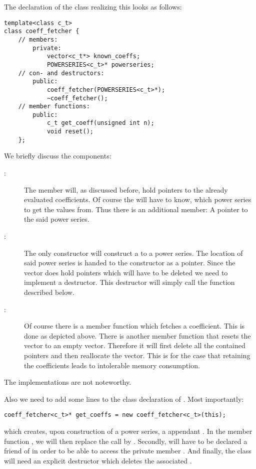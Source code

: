 The declaration of the class realizing this looks as follows:
\begin{lstlisting}
template<class c_t>
class coeff_fetcher {
	// members:
		private:
			vector<c_t*> known_coeffs;
			POWERSERIES<c_t>* powerseries;
	// con- and destructors:
		public:
			coeff_fetcher(POWERSERIES<c_t>*);
			~coeff_fetcher();
	// member functions:
		public:
			c_t get_coeff(unsigned int n);
			void reset();
	};
\end{lstlisting}
We briefly discuss the components:
\begin{description}
\item[:] The member  will, as discussed before, hold pointers to the already evaluated coefficients. Of course the  will have to know, which power series to get the values from. Thus there is an additional member: A pointer to the said power series.
\item[:] The only constructor will construct a  to a power series. The location of said power series is handed to the constructor as a pointer. Since the vector  does hold pointers which will have to be deleted we need to implement a destructor. This destructor will simply call the function  described below.
\item[:] Of course there is a member function  which fetches a coefficient. This is done as depicted above. There is another member function  that resets the vector  to an empty vector. Therefore it will first delete all the contained pointers and then reallocate the vector. This is for the case that retaining the coefficients leads to intolerable memory consumption.
\end{description}
The implementations are not noteworthy.

Also we need to add some lines to the class declaration of . Most importantly:
\begin{lstlisting}
coeff_fetcher<c_t>* get_coeffs = new coeff_fetcher<c_t>(this);
\end{lstlisting}
which creates, upon construction of a power series, a appendant . In the member function , we will then replace the call  by . Secondly,  will have to be declared a friend of  in order to be able to access the private member . And finally, the class  will need an explicit destructor which deletes the associated .


